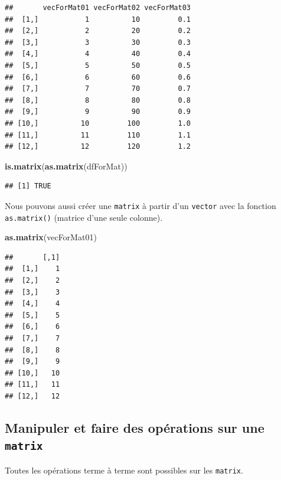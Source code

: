 \documentclass[twoside,symmetric]{book}
\newenvironment{Shaded}{}{}
\newcommand{\KeywordTok}[1]{\textbf{#1}}
\newcommand{\NormalTok}[1]{#1}
\begin{document}
\begin{verbatim}
##       vecForMat01 vecForMat02 vecForMat03
##  [1,]           1          10         0.1
##  [2,]           2          20         0.2
##  [3,]           3          30         0.3
##  [4,]           4          40         0.4
##  [5,]           5          50         0.5
##  [6,]           6          60         0.6
##  [7,]           7          70         0.7
##  [8,]           8          80         0.8
##  [9,]           9          90         0.9
## [10,]          10         100         1.0
## [11,]          11         110         1.1
## [12,]          12         120         1.2
\end{verbatim}

\begin{Shaded}
\begin{Highlighting}[]
\KeywordTok{is.matrix}\NormalTok{(}\KeywordTok{as.matrix}\NormalTok{(dfForMat))}
\end{Highlighting}
\end{Shaded}

\begin{verbatim}
## [1] TRUE
\end{verbatim}

Nous pouvons aussi créer une \texttt{matrix} à partir d'un \texttt{vector} avec la fonction \texttt{as.matrix()} (matrice d'une seule colonne).

\begin{Shaded}
\begin{Highlighting}[]
\KeywordTok{as.matrix}\NormalTok{(vecForMat01)}
\end{Highlighting}
\end{Shaded}

\begin{verbatim}
##       [,1]
##  [1,]    1
##  [2,]    2
##  [3,]    3
##  [4,]    4
##  [5,]    5
##  [6,]    6
##  [7,]    7
##  [8,]    8
##  [9,]    9
## [10,]   10
## [11,]   11
## [12,]   12
\end{verbatim}

\hypertarget{manipuler-et-faire-des-opuxe9rations-sur-une-matrix}{%
\subsection{\texorpdfstring{Manipuler et faire des opérations sur une \texttt{matrix}}{Manipuler et faire des opérations sur une matrix}}\label{manipuler-et-faire-des-opuxe9rations-sur-une-matrix}}

Toutes les opérations terme à terme sont possibles sur les \texttt{matrix}.
\end{document}
